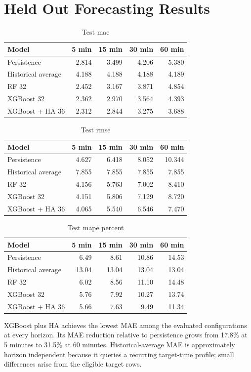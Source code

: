 \documentclass[conference]{IEEEtran}
\begin{document}
\section{Held Out Forecasting Results}
\begin{table}[t]
\caption{Test mae}
\centering\footnotesize
\begin{tabular}{lrrrr}
\toprule
Model & 5 min & 15 min & 30 min & 60 min\\
\midrule
Persistence & 2.814 & 3.499 & 4.206 & 5.380\\
Historical average & 4.188 & 4.188 & 4.188 & 4.189\\
RF 32 & 2.452 & 3.167 & 3.871 & 4.854\\
XGBoost 32 & 2.362 & 2.970 & 3.564 & 4.393\\
XGBoost + HA 36 & 2.312 & 2.844 & 3.275 & 3.688\\
\bottomrule
\end{tabular}
\end{table}
\begin{table}[t]
\caption{Test rmse}
\centering\footnotesize
\begin{tabular}{lrrrr}
\toprule
Model & 5 min & 15 min & 30 min & 60 min\\
\midrule
Persistence & 4.627 & 6.418 & 8.052 & 10.344\\
Historical average & 7.855 & 7.855 & 7.855 & 7.855\\
RF 32 & 4.156 & 5.763 & 7.002 & 8.410\\
XGBoost 32 & 4.151 & 5.806 & 7.129 & 8.720\\
XGBoost + HA 36 & 4.065 & 5.540 & 6.546 & 7.470\\
\bottomrule
\end{tabular}
\end{table}
\begin{table}[t]
\caption{Test mape percent}
\centering\footnotesize
\begin{tabular}{lrrrr}
\toprule
Model & 5 min & 15 min & 30 min & 60 min\\
\midrule
Persistence & 6.49 & 8.61 & 10.86 & 14.53\\
Historical average & 13.04 & 13.04 & 13.04 & 13.04\\
RF 32 & 6.02 & 8.56 & 11.10 & 14.48\\
XGBoost 32 & 5.76 & 7.92 & 10.27 & 13.74\\
XGBoost + HA 36 & 5.66 & 7.63 & 9.49 & 11.34\\
\bottomrule
\end{tabular}
\end{table}
XGBoost plus HA achieves the lowest MAE among the evaluated configurations at every horizon. Its MAE reduction relative to persistence grows from 17.8\% at 5 minutes to 31.5\% at 60 minutes. Historical-average MAE is approximately horizon independent because it queries a recurring target-time profile; small differences arise from the eligible target rows.
\end{document}
